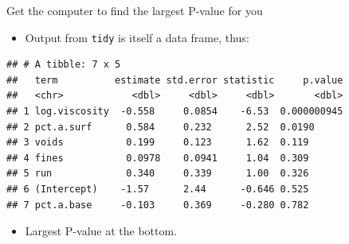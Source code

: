 \documentclass[ignorenonframetext,]{beamer}
\newenvironment{Shaded}{\begin{snugshade}}{\end{snugshade}}
\newcommand{\FloatTok}[1]{\textcolor[rgb]{0.00,0.00,0.81}{#1}}
\newcommand{\KeywordTok}[1]{\textcolor[rgb]{0.13,0.29,0.53}{\textbf{#1}}}
\newcommand{\NormalTok}[1]{#1}
\newcommand{\OperatorTok}[1]{\textcolor[rgb]{0.81,0.36,0.00}{\textbf{#1}}}
\newcommand{\StringTok}[1]{\textcolor[rgb]{0.31,0.60,0.02}{#1}}
\providecommand{\tightlist}{%
  \setlength{\itemsep}{0pt}\setlength{\parskip}{0pt}}
\begin{document}
\begin{frame}[fragile]{Get the computer to find the largest P-value for
you}
\protect\hypertarget{get-the-computer-to-find-the-largest-p-value-for-you}{}

\begin{itemize}
\tightlist
\item
  Output from \texttt{tidy} is itself a data frame, thus:
\end{itemize}

\begin{Shaded}
\end{Shaded}

\begin{verbatim}
## # A tibble: 7 x 5
##   term          estimate std.error statistic     p.value
##   <chr>            <dbl>     <dbl>     <dbl>       <dbl>
## 1 log.viscosity  -0.558     0.0854    -6.53  0.000000945
## 2 pct.a.surf      0.584     0.232      2.52  0.0190     
## 3 voids           0.199     0.123      1.62  0.119      
## 4 fines           0.0978    0.0941     1.04  0.309      
## 5 run             0.340     0.339      1.00  0.326      
## 6 (Intercept)    -1.57      2.44      -0.646 0.525      
## 7 pct.a.base     -0.103     0.369     -0.280 0.782
\end{verbatim}

\begin{itemize}
\tightlist
\item
  Largest P-value at the bottom.
\end{itemize}

\end{frame}
\end{document}
